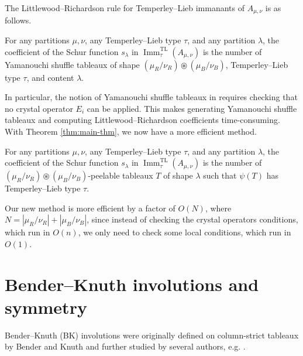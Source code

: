 \documentclass[ALCO,Unicode]{cedram}
\newcommand{\Imm}{\operatorname{Imm}}
\newcommand{\TL}{\operatorname{TL}}
\begin{document}
    The Littlewood--Richardson rule for Temperley--Lieb immanants of $A_{\mu,\nu}$ is as follows.

    \begin{theorem}\label{thm:LR-rule}
        For any partitions $\mu,\nu$, any Temperley--Lieb type $\tau$, and any partition $\lambda$, the coefficient of the Schur function $s_\lambda$ in $\Imm^{\TL}_\tau(A_{\mu,\nu})$ is the number of Yamanouchi shuffle tableaux of shape $(\mu_R/\nu_R)\circledast(\mu_B/\nu_B)$, Temperley--Lieb type $\tau$, and content $\lambda$.
    \end{theorem}

    In particular, the notion of Yamanouchi shuffle tableaux in \cite{nguyen2025temperley} requires checking that no crystal operator $E_i$ can be applied. This makes generating Yamanouchi shuffle tableaux and computing Littlewood--Richardson coefficients time-consuming. With Theorem \ref{thm:main-thm}, we now have a more efficient method.

    \begin{coro}\label{cor:new-LR-rule}
        For any partitions $\mu,\nu$, any Temperley--Lieb type $\tau$, and any partition $\lambda$, the coefficient of the Schur function $s_\lambda$ in $\Imm^{\TL}_\tau(A_{\mu,\nu})$ is the number of $(\mu_R/\nu_R)\circledast(\mu_B/\nu_B)$-peelable tableaux $T$ of shape $\lambda$ such that $\psi(T)$ has Temperley--Lieb type $\tau$.
    \end{coro}

    \begin{rema}
        Our new method is more efficient by a factor of $O(N)$, where $N = |\mu_R/\nu_R|+|\mu_B/\nu_B|$, since instead of checking the crystal operators conditions, which run in $O(n)$, we only need to check some local conditions, which run in $O(1)$.
    \end{rema}


\section{Bender--Knuth involutions and symmetry}\label{sec:BK}

    Bender--Knuth (BK) involutions were originally defined on column-strict tableaux by Bender and Knuth \cite{benderknuth1972} and further studied by several authors, e.g. \cite{SCHUTZENBERGER1972,berenstein-zelevenski,berenstein-kirilov,CGP,chiang2024bender,nguyen2023cactus}. 
\end{document}
